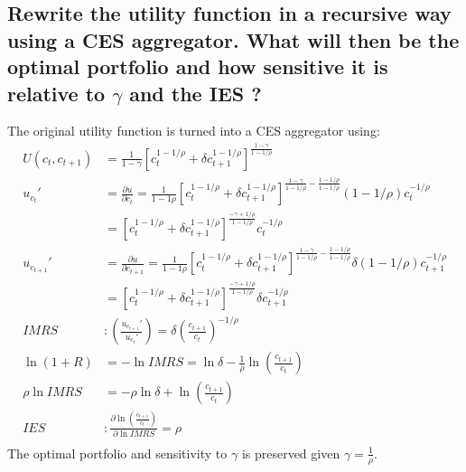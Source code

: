 \documentclass[12pt]{article}
\begin{document}
	\subsection{Rewrite the utility function in a recursive way using a CES aggregator. What will then be the optimal portfolio and how sensitive it is relative to $\gamma$ and the IES ?}
	The original utility function is turned into a CES aggregator using:
	\begin{align*}
		U(c_t, c_{t+1}) &= \frac{1}{1-\gamma} \left[c_t^{1-1/\rho} + \delta c_{t+1}^{1-1/\rho}\right]^{\frac{1-\gamma}{1-1/\rho}}\\
		u_{c_t}' &= \frac{\partial u}{\partial c_t} = \frac{1}{1-1\rho}\left[c_t^{1-1/\rho} + \delta c_{t+1}^{1-1/\rho}\right]^{\frac{1-\gamma}{1-1/\rho} - \frac{1-1/\rho}{1-1/\rho}} (1-1/\rho)c_t^{-1/\rho}\\
		&= \left[c_t^{1-1/\rho} + \delta c_{t+1}^{1-1/\rho}\right]^{\frac{-\gamma + 1/\rho}{1-1/\rho}} c_t^{-1/\rho}\\
		u_{c_{t+1}}' &= \frac{\partial u}{\partial c_{t+1}} = \frac{1}{1-1\rho}\left[c_t^{1-1/\rho} + \delta c_{t+1}^{1-1/\rho}\right]^{\frac{1-\gamma}{1-1/\rho} - \frac{1-1/\rho}{1-1/\rho}} \delta (1-1/\rho)c_{t+1}^{-1/\rho}\\
		&= \left[c_t^{1-1/\rho} + \delta c_{t+1}^{1-1/\rho}\right]^{\frac{-\gamma + 1/\rho}{1-1/\rho}} \delta c_{t+1}^{-1/\rho}\\
		IMRS &: \left( \frac{u_{c_{t+1}}'}{u_{c_t}'} \right) = \delta \left(\frac{c_{t+1}}{c_t}\right)^{-1/\rho}\\
		\ln (1+R) &= -\ln IMRS = \ln \delta -\frac{1}{\rho} \ln \left(\frac{c_{t+1}}{c_t}\right)\\
		\rho \ln IMRS &= -\rho \ln \delta + \ln \left(\frac{c_{t+1}}{c_t}\right)\\
		IES &: \frac{\partial \ln \left(\frac{c_{t+1}}{c_t}\right)}{\partial \ln IMRS} = \rho\\
	\end{align*}
	The optimal portfolio and sensitivity to $\gamma$ is preserved given $\gamma = \frac{1}{\rho}$.
	
\end{document}
